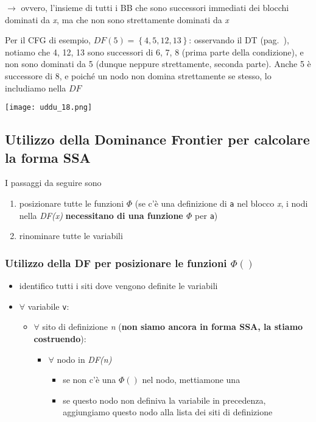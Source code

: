\noindent $\rightarrow$ ovvero, l'insieme di tutti i BB che sono successori immediati dei blocchi dominati da \textit{x}, ma che non sono strettamente dominati da \textit{x}
\newpage
\begin{example}
  \noindent\begin{minipage}[c]{.5\textwidth}
    Per il CFG di esempio, \underline{$DF(5) = \left\lbrace 4,5,12,13 \right\rbrace$}: osservando il DT (pag.~\pageref{example-dt}), notiamo che 4, 12, 13 sono successori di 6, 7, 8 (prima parte della condizione), e non sono dominati da 5 (dunque neppure strettamente, seconda parte). Anche 5 \`e successore di 8, e poich\'e un nodo non domina strettamente se stesso, lo includiamo nella $DF$
  \end{minipage}
  \begin{minipage}[c]{.5\textwidth}
    \texttt{[image: uddu\_18.png]}
  \end{minipage}
\end{example}

\subsection{Utilizzo della Dominance Frontier per calcolare la forma SSA}

I passaggi da seguire sono
\begin{enumerate}
  \item posizionare tutte le funzioni $\Phi$ (se c'\`e una definizione di \lstinline|a| nel blocco \textit{x}, i nodi nella \textit{DF(x)} \textbf{necessitano di una funzione $\Phi$} per \lstinline|a|)
  \item rinominare tutte le variabili
\end{enumerate}

\subsubsection{Utilizzo della DF per posizionare le funzioni $\Phi()$}

\begin{itemize}
  \item identifico tutti i siti dove vengono definite le variabili 
  \item $\forall$ variabile \lstinline|v|:
    \begin{itemize}
      \item $\forall$ sito di definizione \textit{n} (\textbf{non siamo ancora in forma SSA, la stiamo costruendo}):
        \begin{itemize}
          \item $\forall$ nodo in \textit{DF(n)}
            \begin{itemize}
              \item se non c'\`e una $\Phi()$ nel nodo, mettiamone una
              \item se questo nodo non definiva la variabile in precedenza, aggiungiamo questo nodo alla lista dei siti di definizione
            \end{itemize}
        \end{itemize}
    \end{itemize}
\end{itemize}

